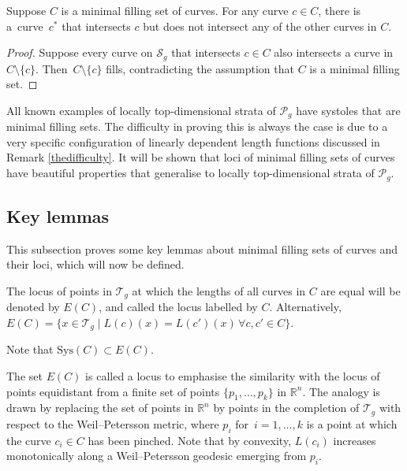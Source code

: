 \begin{Lemma}
Suppose $C$ is a minimal filling set of curves. For any curve $c\in C$, there is a~curve~$c^{*}$ that intersects $c$ but does not intersect any of the other curves in $C$.
\end{Lemma}
\begin{proof}
Suppose every curve on $\mathcal{S}_{g}$ that intersects $c\in C$ also intersects a curve in $C\setminus \{c\}$. Then~${C\setminus \{c\}}$ fills, contradicting the assumption that $C$ is a minimal filling set.
\end{proof}

All known examples of locally top-dimensional strata of $\mathcal{P}_{g}$ have systoles that are minimal filling sets. The difficulty in proving this is always the case is due to a very specific configuration of linearly dependent length functions discussed in Remark \ref{thedifficulty}. It will be shown that loci of minimal filling sets of curves have beautiful properties that generalise to locally top-dimensional strata of $\mathcal{P}_{g}$.

\subsection{Key lemmas}
This subsection proves some key lemmas about minimal filling sets of curves and their loci, which will now be defined.

\begin{Definition}
The locus of points in $\mathcal{T}_{g}$ at which the lengths of all curves in $C$ are equal will be denoted by $E(C)$, and called the locus labelled by $C$. Alternatively,
$E(C)=\{x\in \mathcal{T}_{g} \mid L(c)(x)=L(c')(x) \, \forall c,c'\in C\}$.
\end{Definition}
Note that $\mathrm{Sys}(C)\subset E(C)$.

The set $E(C)$ is called a locus to emphasise the similarity with the locus of points equidistant from a finite set of points $\{p_{1}, \dots, p_{k}\}$ in $\mathbb{R}^{n}$. The analogy is drawn by replacing the set of points in $\mathbb{R}^{n}$ by points in the completion of $\mathcal{T}_{g}$ with respect to the Weil--Petersson metric, where $p_{i}$ for~${i=1, \dots, k}$ is a point at which the curve $c_{i}\in C$ has been pinched. Note that by convexity, $L(c_{i})$ increases monotonically along a Weil--Petersson geodesic emerging from $p_i$.

